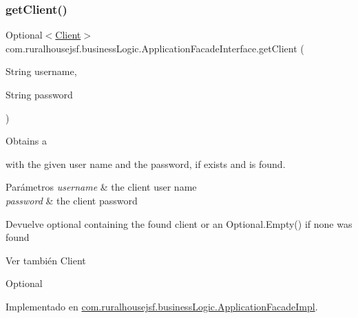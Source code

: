 \mbox{\label{interfacecom_1_1ruralhousejsf_1_1business_logic_1_1_application_facade_interface_af9901ddc9cbe77aaa08085c3c19167c6}} 
\subsubsection{\texorpdfstring{getClient()}{getClient()}}
{\footnotesize\ttfamily Optional$<$\mbox{\hyperlink{classcom_1_1ruralhousejsf_1_1domain_1_1_client}{Client}}$>$ com.\+ruralhousejsf.\+business\+Logic.\+Application\+Facade\+Interface.\+get\+Client (\begin{DoxyParamCaption}\item[{String}]{username,  }\item[{String}]{password }\end{DoxyParamCaption})}

Obtains a
\begin{DoxyCode}{0}
\end{DoxyCode}
 with the given user name and the password, if exists and is found.


\begin{DoxyParams}{Parámetros}
{\em username} & the client user name \\
\hline
{\em password} & the client password\\
\hline
\end{DoxyParams}
\begin{DoxyReturn}{Devuelve}
optional containing the found client or an {\ttfamily Optional.\+Empty()} if none was found
\end{DoxyReturn}
\begin{DoxySeeAlso}{Ver también}
Client 

Optional 
\end{DoxySeeAlso}


Implementado en \mbox{\hyperlink{classcom_1_1ruralhousejsf_1_1business_logic_1_1_application_facade_impl_a249a902aa3507a04fb15ab5fcf1f082c}{com.\+ruralhousejsf.\+business\+Logic.\+Application\+Facade\+Impl}}.

\mbox{\label{interfacecom_1_1ruralhousejsf_1_1business_logic_1_1_application_facade_interface_a31b31b351fd53d7eabe3346b043dc744}} 
